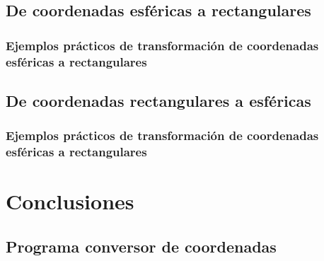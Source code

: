 \documentclass[letterpaper,14pt]{extreport} %
\begin{document}
      \subsection{De coordenadas esféricas a rectangulares}
          

          \subsubsection{Ejemplos prácticos de transformación de coordenadas esféricas a rectangulares}
          

      \subsection{De coordenadas rectangulares a esféricas}
          

          \subsubsection{Ejemplos prácticos de transformación de coordenadas esféricas a rectangulares}
          

    \section{Conclusiones}
      

      \subsection{Programa conversor de coordenadas}
      


  \medskip

  \printbibliography[title={Referencias}]
\end{document}
